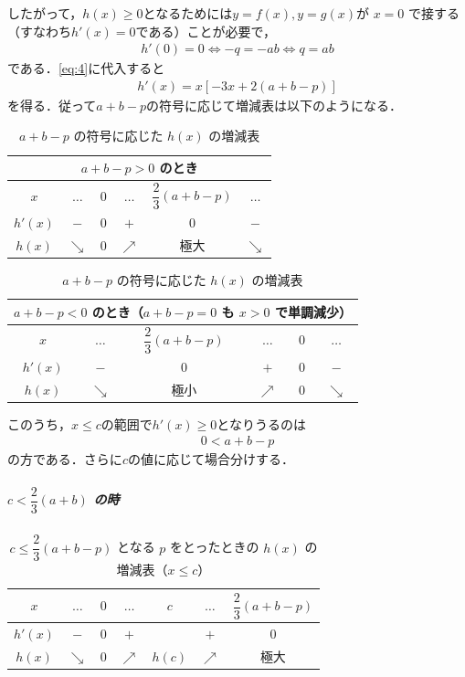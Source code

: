 \documentclass[../../main.tex]{subfiles}
\begin{document}
したがって，$h(x) \ge 0$となるためには$y=f(x), y=g(x)$が $x=0$ で接する（すなわち$h'(x)=0$である）ことが必要で，
\begin{align}
  h'(0)=0 \iff -q = -ab \iff q = ab \label{eq:5}
\end{align}
である．\cref{eq:4}に代入すると
\begin{align}
  h'(x) = x [ -3x + 2(a+b-p) ] \label{eq:6}
\end{align}
を得る．従って$a+b-p$の符号に応じて増減表は以下のようになる．

\begin{table}[htb]
  \centering
  \caption{$a+b-p$ の符号に応じた $h(x)$ の増減表}
  \label{tab:1962_4_hx_variation}
  \renewcommand{\arraystretch}{1.4}
  \begin{tabular}{c|ccccc}
    \multicolumn{6}{c}{$a+b-p > 0$ のとき} \\[2pt]
    \hline
    $x$ & $\dots$ & $0$ & $\dots$ & $\dfrac{2}{3}(a+b-p)$ & $\dots$ \\ \hline
    $h'(x)$ & $-$ & $0$ & $+$ & $0$ & $-$ \\ \hline
    $h(x)$ & $\searrow$ & $0$ & $\nearrow$ & 極大 & $\searrow$ \\ \hline
  \end{tabular}
  \hspace{1.2cm}
  \begin{tabular}{c|ccccc}
    \multicolumn{6}{c}{$a+b-p < 0$ のとき（$a+b-p=0$ も $x>0$ で単調減少）} \\[2pt]
    \hline
    $x$ & $\dots$ & $\dfrac{2}{3}(a+b-p)$ & $\dots$ & $0$ & $\dots$ \\ \hline
    $h'(x)$ & $-$ & $0$ & $+$ & $0$ & $-$ \\ \hline
    $h(x)$ & $\searrow$ & 極小 & $\nearrow$ & $0$ & $\searrow$ \\ \hline
  \end{tabular}
\end{table}

このうち，$x \le c$の範囲で$h'(x) \ge 0$となりうるのは
\begin{align}
  0 < a+b-p \label{eq:7}
\end{align}
の方である．さらに$c$の値に応じて場合分けする．

\subparagraph{$c < \dfrac{2}{3}(a+b)$ の時}

\begin{table}[htb]
  \centering
  \caption{$c \le \dfrac{2}{3}(a+b-p)$ となる $p$ をとったときの $h(x)$ の増減表（$x \le c$）}
  \label{tab:1962_4_case1}
  \renewcommand{\arraystretch}{1.4}
  \begin{tabular}{c|cccc|cc}
    \hline
    $x$ & $\dots$ & $0$ & $\dots$ & $c$ & $\dots$ & $\dfrac{2}{3}(a+b-p)$ \\ \hline
    $h'(x)$ & $-$ & $0$ & $+$ & & $+$ & $0$ \\ \hline
    $h(x)$ & $\searrow$ & $0$ & $\nearrow$ & $h(c)$ & $\nearrow$ & 極大 \\ \hline
  \end{tabular}
\end{table}
\end{document}

